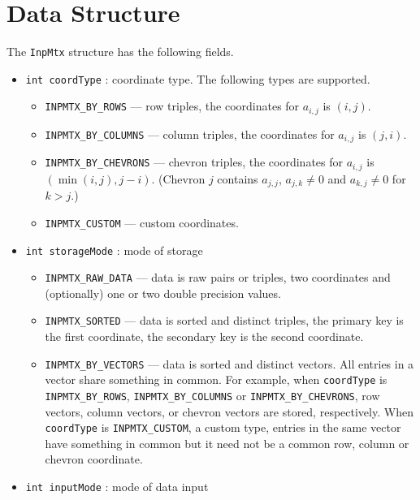 \par
\section{Data Structure}
\label{section:InpMtx:dataStructure}
\par
\par
The {\tt InpMtx} structure has the following fields.
\begin{itemize}
\item
{\tt int coordType} : coordinate type. The following types are
supported.
\begin{itemize}
\item {\tt INPMTX\_BY\_ROWS} --- row triples, 
                  the coordinates for $a_{i,j}$ is $(i,j)$.
\item {\tt INPMTX\_BY\_COLUMNS} --- column triples, 
                  the coordinates for $a_{i,j}$ is $(j,i)$.
\item {\tt INPMTX\_BY\_CHEVRONS} --- chevron triples, 
                  the coordinates for $a_{i,j}$ is $(\min(i,j), j-i)$.
(Chevron $j$ contains $a_{j,j}$, $a_{j,k} \ne 0$ and $a_{k,j} \ne 0$
for $k > j$.)
\item {\tt INPMTX\_CUSTOM} --- custom coordinates.
\end{itemize}
\item
{\tt int storageMode} : mode of storage
\begin{itemize}
\item {\tt INPMTX\_RAW\_DATA} --- 
data is raw pairs or triples, two coordinates and (optionally)
one or two double precision values. 
\item {\tt INPMTX\_SORTED} --- data is sorted and distinct triples, 
                  the primary key is the first coordinate,
                  the secondary key is the second coordinate.
\item {\tt INPMTX\_BY\_VECTORS} --- data is sorted and distinct vectors.
All entries in a vector share something in common. 
For example, when {\tt coordType} is {\tt INPMTX\_BY\_ROWS}, 
{\tt INPMTX\_BY\_COLUMNS} or {\tt INPMTX\_BY\_CHEVRONS},
row vectors, column vectors, or chevron vectors are stored,
respectively.
When {\tt coordType} is {\tt INPMTX\_CUSTOM}, 
a custom type, entries in the same
vector have something in common but it need not be a common row,
column or chevron coordinate.
\end{itemize}
\item
{\tt int inputMode} : mode of data input
\begin{itemize}

\end{itemize}
\end{itemize}
